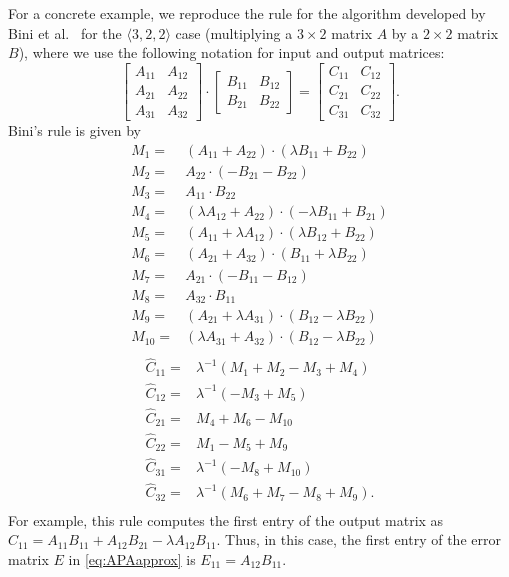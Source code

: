 \documentclass[sigconf,review,anonymous]{acmart}
\newcommand{\dims}[1]{\langle #1 \rangle}
\begin{document}
For a concrete example, we reproduce the rule for the algorithm developed by Bini et al.~\cite{BCRL79} for the $\dims{3,2,2}$ case (multiplying a $3\times 2$ matrix $A$ by a $2\times 2$ matrix $B$), where we use the following notation for input and output matrices:
$$
\begin{bmatrix} A_{11} & A_{12} \\ A_{21} & A_{22} \\ A_{31} & A_{32}  \end{bmatrix} \cdot
\begin{bmatrix} B_{11} & B_{12} \\ B_{21} & B_{22} \end{bmatrix}=
\begin{bmatrix} C_{11} & C_{12} \\ C_{21} & C_{22} \\ C_{31} & C_{32} \end{bmatrix} .$$
Bini's rule is given by
\begin{align*}
M_1 =& (A_{11} + A_{22}) \cdot (\lambda B_{11} + B_{22}) \\
M_2 =& A_{22}\cdot  (-B_{21} - B_{22}) \\
M_3 =& A_{11}\cdot B_{22} \\
M_4 =& (\lambda A_{12} + A_{22})\cdot (-\lambda B_{11} + B_{21}) \\
M_5 =& (A_{11} + \lambda A_{12}) \cdot (\lambda B_{12} + B_{22}) \\
M_6 =& (A_{21} + A_{32}) \cdot (B_{11} + \lambda B_{22}) \\
M_7 =& A_{21} \cdot (-B_{11} - B_{12}) \\
M_8 =& A_{32} \cdot B_{11}\\
M_9 =& (A_{21} + \lambda A_{31}) \cdot (B_{12} - \lambda B_{22})\\
M_{10} =& (\lambda A_{31} + A_{32}) \cdot (B_{12} - \lambda B_{22})\\
\end{align*}
\begin{align*}
\hat C_{11} =& \lambda^{-1} (M_1 + M_2 - M_3 + M_4) \\
\hat C_{12} =& \lambda^{-1} (-M_3 + M_5) \\
\hat C_{21} =& M_4 + M_6 - M_{10}\\
\hat C_{22} =& M_1 - M_5 + M_9\\
\hat C_{31} =& \lambda^{-1} (-M_8 + M_{10}) \\
\hat C_{32} =& \lambda^{-1} (M_6 + M_7 - M_8 + M_9).\\
\end{align*}
For example, this rule computes the first entry of the output matrix as $\hat C_{11} = A_{11}  B_{11} + A_{12}  B_{21} - \lambda A_{12}  B_{11}$.
Thus, in this case, the first entry of the error matrix $E$ in \cref{eq:APAapprox} is $E_{11} = A_{12}  B_{11}$.
\end{document}
